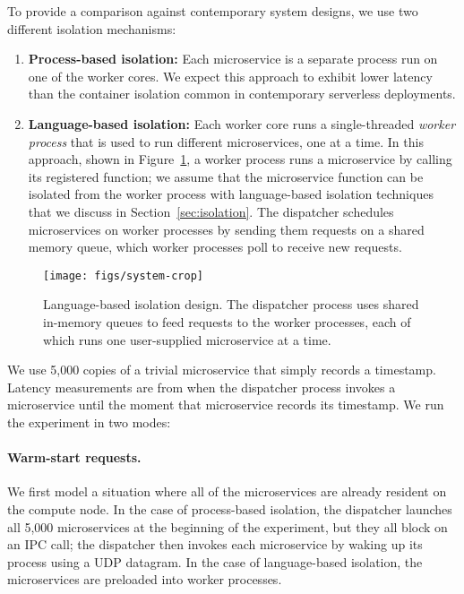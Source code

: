 To provide a comparison against contemporary system designs, we use two different
isolation mechanisms:
\begin{enumerate}
\item \textbf{Process-based isolation:} Each microservice is a separate process run
on one of the worker cores.
We expect this approach to exhibit lower latency than the container isolation common
in contemporary serverless deployments.
\item \textbf{Language-based isolation:} Each worker core runs a single-threaded
\emph{worker process} that is used to run different microservices, one at a time.
In this approach, shown in Figure~\ref{fig:sysdesign}, a worker process runs a
microservice by calling its registered
function; we assume that the microservice function can be isolated from the
worker process with language-based isolation techniques that we discuss in
Section~\ref{sec:isolation}. The dispatcher schedules microservices on worker
processes by sending them
requests on a shared memory queue, which worker processes poll to receive
new requests.
\end{enumerate}

\begin{figure}
\texttt{[image: figs/system-crop]}
\caption{Language-based isolation design.  The dispatcher process
uses shared in-memory queues to feed requests to the worker processes, each of
which runs one user-supplied microservice at a time.}
\label{fig:sysdesign}
\end{figure}

We use 5,000 copies of a trivial microservice that simply records a timestamp.
Latency measurements are from when the dispatcher process invokes a microservice
until the moment that microservice records its timestamp.  We run the experiment in
two modes:

\paragraph{Warm-start requests.}
We first model a situation where all of the microservices are already resident on the
compute node.  In the case of process-based isolation, the dispatcher launches all
5,000 microservices at the beginning of the experiment, but they all block on an IPC
call; the dispatcher then invokes each microservice by waking up its process using a
UDP datagram.  In the case of language-based isolation, the microservices are
preloaded into worker processes.

